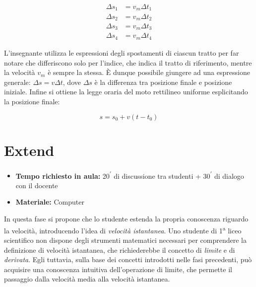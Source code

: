 \documentclass{report} \usepackage[T1]{fontenc} \usepackage[italian]{babel}
\begin{document}
\begin{align}
\Delta s_1 &= v_m \Delta t_1 \\
\Delta s_2 &= v_m \Delta t_2 \\
\Delta s_3 &= v_m \Delta t_3 \\
\Delta s_4 &= v_m \Delta t_4
\end{align}

L’insegnante utilizza le espressioni degli spostamenti di ciascun tratto
per far notare che differiscono solo per l’indice, che indica il tratto di
riferimento, mentre la velocità $v_m$ è sempre la stessa. \`E dunque possibile
giungere ad una espressione generale: $\Delta s= v \Delta t$, dove $\Delta s$
è la differenza tra posizione finale e posizione iniziale.
Infine si ottiene la legge oraria del moto rettilineo uniforme esplicitando la
posizione finale:

\begin{equation}
s = s_0 + v (t - t_0)
\end{equation}

\pagebreak

\section{Extend}

\begin{itemize}
\item \textbf{Tempo richiesto in aula:} 20\textsuperscript{$\prime$} di discussione tra studenti
      + 30\textsuperscript{$\prime$} di dialogo con il docente
\item \textbf{Materiale:} Computer
\end{itemize}

In questa fase si propone che lo studente estenda la propria conoscenza
riguardo la velocità, introducendo l'idea di \emph{velocità istantanea}.
Uno studente di 1\textsuperscript{a} liceo scientifico non dispone
degli strumenti matematici necessari per comprendere la definizione
di velocità istantanea, che richiederebbe il concetto
di \emph{limite} e di \emph{derivata}. Egli tuttavia, sulla base
dei concetti introdotti nelle fasi precedenti, può acquisire
una conoscenza intuitiva dell'operazione di limite, che permette
il passaggio dalla velocità media alla velocità istantanea.
\end{document}

